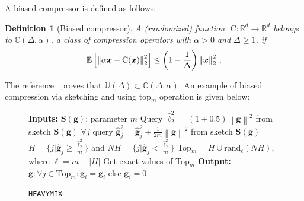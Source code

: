 \documentclass[11pt]{article}
\newtheorem{lemma}{Lemma}
\newtheorem{definition}{Definition}
\begin{document}
A biased compressor is defined as follows:
\begin{definition}[Biased compressor]
A (randomized) function,  ${\text{C}}:\mathbb{R}^{d}\rightarrow\mathbb{R}^{d}$ belongs to $\mathbb{C}(\Delta,\alpha)$, a class of compression operators with $\alpha>0$ and $\Delta\geq 1$, if
\begin{align}\notag
    \mathbb{E}\left[\left\|\alpha\boldsymbol{x}-{\text{C}}(\boldsymbol{x})\right\|^2_2\right]\leq \left(1-\frac{1}{\Delta}\right)\left\|\boldsymbol{x}\right\|^2_2\, ,
\end{align}
\end{definition}
The reference~\citep{horvath2020better} proves that $\mathbb{U}(\Delta)\subset\mathbb{C}(\Delta, \alpha)$.
An example of biased compression via sketching and using top$_m$ operation is given below:
\begin{figure}\vspace{-0.4cm}
\begin{minipage}{\linewidth}
\begin{algorithm}[H]
\caption{\texttt{HEAVYMIX}  }\label{alg:heavymix}
\begin{algorithmic}[1]
\STATE \textbf{Inputs:} $\mathbf{S}({\mathbf{g}})$; parameter $m$
\STATE Query $\hat{\ell}_2^2=\left(1\pm 0.5\right)\left\|\mathbf{g}\right\|^2$ from sketch $\mathbf{S}(\mathbf{g})$
\STATE $\forall j$ query $\hat{\mathbf{g}}_j^2=\hat{\mathbf{g}}_j^2\pm \frac{1}{2m}\left\|\mathbf{g}\right\|^2$ from sketch $\mathbf{S}(\mathbf{g})$
\STATE $H=\{j|\hat{\mathbf{g}}_j\geq \frac{\hat{\ell}_2^2}{m}\}$ and $NH=\{j|\hat{\mathbf{g}}_j<\frac{\hat{\ell}_2^2}{m}\}$
\STATE Top$_m=H\cup \text{rand}_\ell(NH)$, where $\ell=m-\left|H\right|$
\STATE Get exact values of Top$_m$ 
\STATE \textbf{Output:} $\tilde{\mathbf{g}}:\forall j\in\text{Top}_m:\tilde{\mathbf{g}}_{i}=\mathbf{g}_{i}$ else $ \mathbf{g}_{i}=0$
\end{algorithmic}
\end{algorithm}
\vspace{-0.1in}
\end{minipage}\end{figure}
\end{document}
